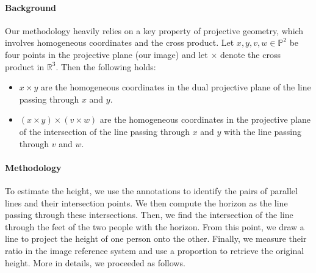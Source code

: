\paragraph{Background} Our methodology heavily relies on a key property of projective geometry, which involves homogeneous coordinates and the cross product. Let $x,y,v,w \in\mathbb{P}^2$ be four points in the projective plane (our image) and let $\times$ denote the cross product in $\mathbb{R}^3$. Then the following holds:

\begin{itemize}
    \item $x \times y$ are the homogeneous coordinates in the dual projective plane of the line passing through $x$ and $y$. 
    \item $(x \times y) \times (v \times w)$ are the homogeneous coordinates in the projective plane of the intersection of the line passing through $x$ and $y$ with the line passing through $v$ and $w$.
\end{itemize}

\paragraph{Methodology} To estimate the height, we use the annotations to identify the pairs of parallel lines and their intersection points. We then compute the horizon as the line passing through these intersections. Then, we find the intersection of the line through the feet of the two people with the horizon. From this point, we draw a line to project the height of one person onto the other. Finally, we measure their ratio in the image reference system and use a proportion to retrieve the original height. More in details, we proceeded as follows.

